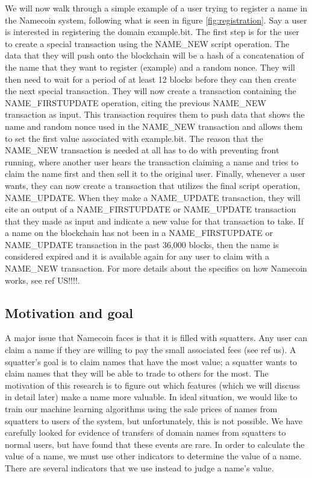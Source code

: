 \documentclass{article} %
\begin{document}
    We will now walk through a simple example of a user trying to register a name in the Namecoin system, following what is seen in figure \ref{fig:registration}. Say a user is interested in registering the domain example.bit. The first step is for the user to create a special transaction using the NAME\_NEW script operation. The data that they will push onto the blockchain will be a hash of a concatenation of the name that they want to register (example) and a random nonce. They will then need to wait for a period of at least 12 blocks before they can then create the next special transaction. They will now create a transaction containing the NAME\_FIRSTUPDATE operation, citing the previous NAME\_NEW transaction as input. This transaction requires them to push data that shows the name and random nonce used in the NAME\_NEW transaction and allows them to set the first value associated with example.bit. The reason that the NAME\_NEW transaction is needed at all has to do with preventing front running, where another user hears the transaction claiming a name and tries to claim the name first and then sell it to the original user. Finally, whenever a user wants, they can now create a transaction that utilizes the final script operation, NAME\_UPDATE. When they make a NAME\_UPDATE transaction, they will cite an output of a NAME\_FIRSTUPDATE or NAME\_UPDATE transaction that they made as input and indicate a new value for that transaction to take. If a name on the blockchain has not been in a NAME\_FIRSTUPDATE or NAME\_UPDATE transaction in the past 36,000 blocks, then the name is considered expired and it is available again for any user to claim with a NAME\_NEW transaction. For more details about the specifics on how Namecoin works, see {ref US!!!!}.

\subsection{Motivation and goal}

    A major issue that Namecoin faces is that it is filled with squatters. Any user can claim a name if they are willing to pay the small associated fees (see {ref us}). A squatter's goal is to claim names that have the most value; a squatter wants to claim names that they will be able to trade to others for the most. The motivation of this research is to figure out which features (which we will discuss in detail later) make a name more valuable. In ideal situation, we would like to train our machine learning algorithms using the sale prices of names from squatters to users of the system, but unfortunately, this is not possible. We have carefully looked for evidence of transfers of domain names from squatters to normal users, but have found that these events are rare. In order to calculate the value of a name, we must use other indicators to determine the value of a name. There are several indicators that we use instead to judge a name's value.
\end{document}
